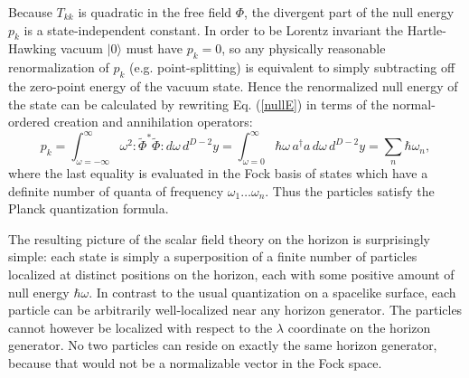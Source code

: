 \documentclass[12pt]{article}
\begin{document}
Because $T_{kk}$ is quadratic in the free field $\Phi$, the divergent part of the null energy $p_k$ is a state-independent constant.  In order to be Lorentz invariant the Hartle-Hawking vacuum $|0\rangle$ must have $p_k = 0$, so any physically reasonable renormalization of
$p_k$ (e.g. point-splitting) is equivalent to simply subtracting off the zero-point energy of the vacuum state.  Hence the renormalized null energy of the state can be calculated by rewriting Eq. (\ref{nullE}) in terms of the normal-ordered creation and annihilation operators:
\begin{equation}
p_k =
\int^{\infty}_{\omega=-\infty} \!\!\!\!\!\! \omega^2 \!:\!\tilde{\Phi}^*\tilde{\Phi}\!: d\omega\,d^{D-2}y
= \int^{\infty}_{\omega=0} \hbar\omega\,a^{\dagger}a\,d\omega\,d^{D-2}y
= \sum_n \hbar \omega_n,
\end{equation}
where the last equality is evaluated in the Fock basis of states which have a definite number of quanta of frequency $\omega_1 \ldots \omega_n$.  Thus the particles satisfy the Planck quantization formula.

The resulting picture of the scalar field theory on the horizon is surprisingly simple: each state is simply a superposition of a finite number of particles localized at distinct positions on the horizon, each with some positive amount of null energy $\hbar \omega$.  In contrast to the usual quantization on a spacelike surface, each particle can be arbitrarily well-localized near any horizon generator.  The particles cannot however be localized with respect to the $\lambda$ coordinate on the horizon generator.  No two particles can reside on exactly the same horizon generator, because that would not be a normalizable vector in the Fock space.
\end{document}

